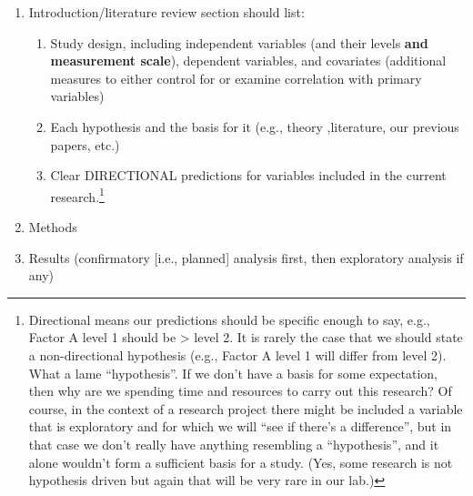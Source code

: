 \documentclass[
]{book}
\providecommand{\tightlist}{%
  \setlength{\itemsep}{0pt}\setlength{\parskip}{0pt}}
\begin{document}
\begin{enumerate}
\def\labelenumi{\arabic{enumi}.}
\tightlist
\item
  Introduction/literature review section should list:

  \begin{enumerate}
  \def\labelenumii{\roman{enumii})}
  \tightlist
  \item
    Study design, including independent variables (and their levels \textbf{and measurement scale}), dependent variables, and covariates (additional measures to either control for or examine correlation with primary variables)
  \item
    Each hypothesis and the basis for it (e.g., theory ,literature, our previous papers, etc.)
  \item
    Clear DIRECTIONAL predictions for variables included in the current research.\footnote{Directional means our predictions should be specific enough to say, e.g., Factor A level 1 should be \textgreater{} level 2. It is rarely the case that we should state a non-directional hypothesis (e.g., Factor A level 1 will differ from level 2). What a lame ``hypothesis''. If we don't have a basis for some expectation, then why are we spending time and resources to carry out this research? Of course, in the context of a research project there might be included a variable that is exploratory and for which we will ``see if there's a difference'', but in that case we don't really have anything resembling a ``hypothesis'', and it alone wouldn't form a sufficient basis for a study. (Yes, some research is not hypothesis driven but again that will be very rare in our lab.)}
  \end{enumerate}
\item
  Methods
\item
  Results (confirmatory {[}i.e., planned{]} analysis first, then exploratory analysis if any)


\end{enumerate}
\end{document}

